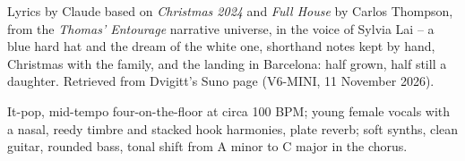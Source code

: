 
\label{sec:elmetto-azzurro}
\begin{notes}
Lyrics by Claude based on \emph{Christmas 2024} and \emph{Full House} by Carlos Thompson, from the \emph{Thomas' Entourage} narrative universe, in the voice of Sylvia Lai -- a blue hard hat and the dream of the white one, shorthand notes kept by hand, Christmas with the family, and the landing in Barcelona: half grown, half still a daughter. Retrieved from Dvigitt's Suno page (V6-MINI, 11 November 2026).
\end{notes}
\begin{style}
It-pop, mid-tempo four-on-the-floor at circa 100 BPM; young female vocals with a nasal, reedy timbre and stacked hook harmonies, plate reverb; soft synths, clean guitar, rounded bass, tonal shift from A minor to C major in the chorus.
\end{style}
